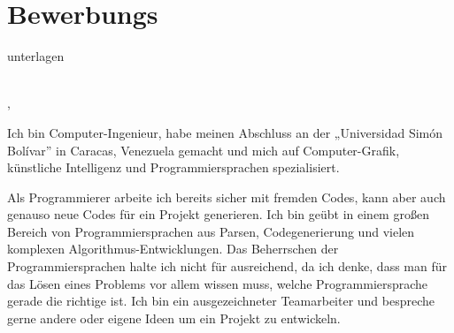 \documentclass[11pt,a4paper,roman]{moderncv}
\begin{document}


\makeatletter
{}
\pagestyle{empty}

\chapter*{Bewerbungs}{unterlagen}

\vspace*{40mm}
\begin{minipage}{\textwidth}
	\vspace*{3mm}
	\familynamestyle{\@firstname}~~\firstnamestyle{\@familyname} 	
	\\[3mm]
	\@addressstreet, \@addresscity ~~~ \mobilesymbol~\@mobile ~~~ \emailsymbol~\@email
\end{minipage}
\begin{minipage}{70pt}

\vspace*{10mm}

\end{minipage}

Ich bin Computer-Ingenieur, habe meinen Abschluss an der „Universidad Simón Bolívar” in Caracas, Venezuela gemacht und mich auf Computer-Grafik, künstliche Intelligenz und Programmiersprachen spezialisiert.

\vspace*{2mm}

Als Programmierer arbeite ich bereits sicher mit fremden Codes, kann aber auch genauso neue Codes für ein Projekt generieren. Ich bin geübt in einem großen Bereich von Programmiersprachen aus Parsen, Codegenerierung und vielen komplexen Algorithmus-Entwicklungen. Das Beherrschen der Programmiersprachen halte ich nicht für ausreichend, da ich denke, dass man für das Lösen eines Problems vor allem wissen muss, welche Programmiersprache gerade die richtige ist. Ich bin ein ausgezeichneter Teamarbeiter und bespreche gerne andere oder eigene Ideen um ein Projekt zu entwickeln. 
\end{document}
